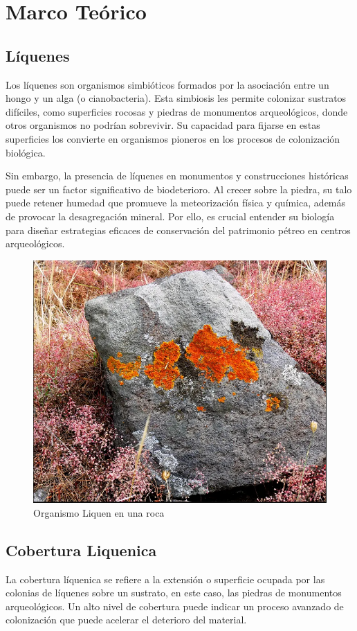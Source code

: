 \chapter{Marco Teórico}

\section{Líquenes}

Los líquenes son organismos simbióticos formados por la asociación entre un hongo y un alga (o cianobacteria). Esta simbiosis les permite colonizar sustratos difíciles, como superficies rocosas y piedras de monumentos arqueológicos, donde otros organismos no podrían sobrevivir. Su capacidad para fijarse en estas superficies los convierte en organismos pioneros en los procesos de colonización biológica. \cite{Gamboa2017}

Sin embargo, la presencia de líquenes en monumentos y construcciones históricas puede ser un factor significativo de biodeterioro. Al crecer sobre la piedra, su talo puede retener humedad que promueve la meteorización física y química, además de provocar la desagregación mineral. Por ello, es crucial entender su biología para diseñar estrategias eficaces de conservación del patrimonio pétreo en centros arqueológicos.

\begin{figure}[h]
	\centering
	\includegraphics[width=0.5\linewidth]{media/liquen-roca}
	\caption{Organismo Liquen en una roca}
	\label{fig:liquen-roca}
\end{figure}


\section{Cobertura Liquenica}

La cobertura líquenica se refiere a la extensión o superficie ocupada por las colonias de líquenes sobre un sustrato, en este caso, las piedras de monumentos arqueológicos. Un alto nivel de cobertura puede indicar un proceso avanzado de colonización que puede acelerar el deterioro del material.

